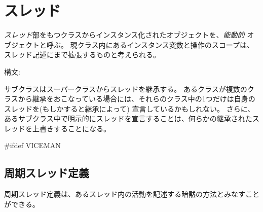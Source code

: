 \documentclass[\pformat,12pt]{jarticle}
\begin{document}
\section{スレッド}\label{ch:thread}

{\em スレッド}部をもつクラスからインスタンス化されたオブジェクトを、{\em 能動的} オブジェクトと呼ぶ。
現クラス内にあるインスタンス変数と操作のスコープは、スレッド記述にまで拡張するものと考えられる。

\begin{description}
\item[構文:]   
\end{description}

サブクラスはスーパークラスからスレッドを継承する。
あるクラスが複数のクラスから継承をおこなっている場合には、それらのクラス中の1つだけは自身のスレッドを(もしかすると継承によって) 宣言しているかもしれない。 
さらに、あるサブクラス中で明示的にスレッドを宣言することは、何らかの継承されたスレッドを上書きすることになる。

#ifdef VICEMAN
\subsection{周期スレッド定義}\label{se:periodic-thread}

周期スレッド定義は、あるスレッド内の活動を記述する暗黙の方法とみなすことができる。
\end{document}
